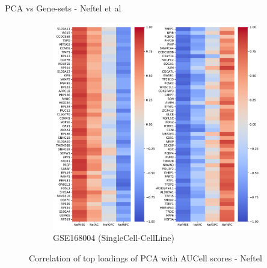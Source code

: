 \documentclass[aspectratio=169,9pt]{beamer}
\begin{document}
\begin{frame}{PCA vs Gene-sets - Neftel et al}
\begin{adjustwidth}{-5cm}{-5cm}
\begin{figure}
\begin{subfigure}[c]{0.48\textwidth}
                    \includegraphics[width=\textwidth]{mgg23_load-corr_Nef}
                    \caption{GSE168004 (SingleCell-CellLine)}
                \end{subfigure}
                \caption{Correlation of top loadings of PCA with AUCell scores - Neftel}
            \end{figure}
        \end{adjustwidth}
    \end{frame}
\end{document}
